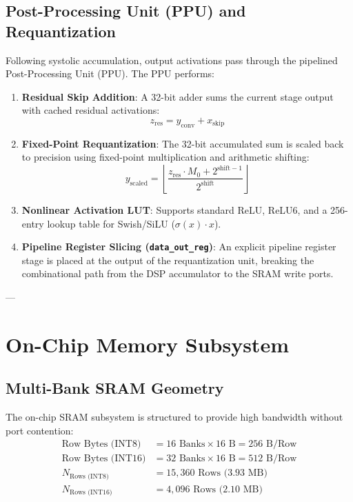 \documentclass[10pt,journal,compsoc]{IEEEtran}
\begin{document}
\subsection{Post-Processing Unit (PPU) and Requantization}
Following systolic accumulation, output activations pass through the pipelined Post-Processing Unit (PPU). The PPU performs:
\begin{enumerate}
    \item \textbf{Residual Skip Addition}: A 32-bit adder sums the current stage output with cached residual activations:
    \begin{equation}
    z_{\text{res}} = y_{\text{conv}} + x_{\text{skip}}
    \end{equation}
    \item \textbf{Fixed-Point Requantization}: The 32-bit accumulated sum is scaled back to precision using fixed-point multiplication and arithmetic shifting:
    \begin{equation}
    y_{\text{scaled}} = \left\lfloor \frac{z_{\text{res}} \cdot M_0 + 2^{\text{shift}-1}}{2^{\text{shift}}} \right\rfloor
    \end{equation}
    \item \textbf{Nonlinear Activation LUT}: Supports standard ReLU, ReLU6, and a 256-entry lookup table for Swish/SiLU ($\sigma(x) \cdot x$).
    \item \textbf{Pipeline Register Slicing (\texttt{data\_out\_reg})}: An explicit pipeline register stage is placed at the output of the requantization unit, breaking the combinational path from the DSP accumulator to the SRAM write ports.
\end{enumerate}

---

\section{On-Chip Memory Subsystem}

\subsection{Multi-Bank SRAM Geometry}
The on-chip SRAM subsystem is structured to provide high bandwidth without port contention:
\begin{align}
\text{Row Bytes (INT8)} &= 16\text{ Banks} \times 16\text{ B} = 256\text{ B/Row} \\
\text{Row Bytes (INT16)} &= 32\text{ Banks} \times 16\text{ B} = 512\text{ B/Row} \\
N_{\text{Rows (INT8)}} &= 15,360\text{ Rows (3.93 MB)} \\
N_{\text{Rows (INT16)}} &= 4,096\text{ Rows (2.10 MB)}
\end{align}
\end{document}
